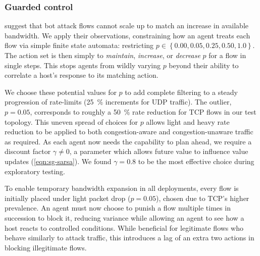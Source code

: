 \documentclass[10pt, times, conference, letterpaper]{IEEEtran}
\begin{document}
\subsubsection{Guarded control}
\Textcite{DBLP:conf/ndss/KangGS16} suggest that bot attack flows cannot scale up to match an increase in available bandwidth.
We apply their observations, constraining how an agent treats each flow via simple finite state automata: restricting $p \in \left\{ 0.00, 0.05, 0.25, 0.50, 1.0 \right\}$.
The action set is then simply to \emph{maintain}, \emph{increase}, or \emph{decrease} $p$ for a flow in single steps.
This stops agents from wildly varying $p$ beyond their ability to correlate a host's response to its matching action.

We choose these potential values for $p$ to add complete filtering to a steady progression of rate-limits (\SI{25}{\percent} increments for UDP traffic).
The outlier, $p=0.05$, corresponds to roughly a \SI{50}{\percent} rate reduction for TCP flows in our test topology.
This uneven spread of choices for $p$ allows light and heavy rate reduction to be applied to both congestion-aware and congestion-unaware traffic as required.
As each agent now needs the capability to plan ahead, we require a discount factor $\gamma \ne 0$, a parameter which allows future value to influence value updates (\cref{eqn:sg-sarsa}).
We found $\gamma = 0.8$ to be the most effective choice during exploratory testing.

To enable temporary bandwidth expansion in all deployments, every flow is initially placed under light packet drop ($p=0.05$), chosen due to TCP's higher prevalence.
An agent must now choose to punish a flow multiple times in succession to block it, reducing variance while allowing an agent to see how a host reacts to controlled conditions.
While beneficial for legitimate flows who behave similarly to attack traffic, this introduces a lag of an extra two actions in blocking illegitimate flows.
\end{document}
